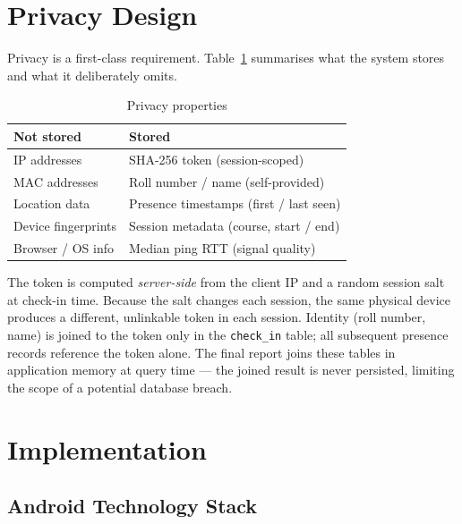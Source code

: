 \documentclass[sigconf,nonacm]{acmart}
\begin{document}
\section{Privacy Design}

Privacy is a first-class requirement.  Table~\ref{tab:privacy}
summarises what the system stores and what it deliberately omits.

\begin{table}[h]
\caption{Privacy properties}
\label{tab:privacy}
\begin{tabular}{ll}
\toprule
\textbf{Not stored} & \textbf{Stored} \\
\midrule
IP addresses        & SHA-256 token (session-scoped) \\
MAC addresses       & Roll number / name (self-provided) \\
Location data       & Presence timestamps (first / last seen) \\
Device fingerprints & Session metadata (course, start / end) \\
Browser / OS info   & Median ping RTT (signal quality) \\
\bottomrule
\end{tabular}
\end{table}

The token is computed \emph{server-side} from the client IP and a
random session salt at check-in time.  Because the salt changes each
session, the same physical device produces a different, unlinkable
token in each session.  Identity (roll number, name) is joined to the
token only in the \texttt{check\_in} table; all subsequent presence
records reference the token alone.  The final report joins these tables
in application memory at query time --- the joined result is never
persisted, limiting the scope of a potential database breach.

\section{Implementation}

\subsection{Android Technology Stack}
\end{document}
